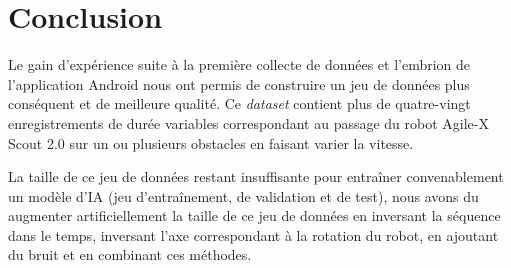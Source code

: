 \section{Conclusion}
Le gain d'expérience suite à la première collecte de données et l'embrion de l'application Android nous ont permis de construire un jeu de données plus conséquent et de meilleure qualité. Ce \textit{dataset} contient plus de quatre-vingt enregistrements de durée variables correspondant au passage du robot Agile-X Scout 2.0 sur un ou plusieurs obstacles en faisant varier la vitesse.

La taille de ce jeu de données restant insuffisante pour entraîner convenablement un modèle d'IA (jeu d'entraînement, de validation et de test), nous avons du augmenter artificiellement la taille de ce jeu de données en inversant la séquence dans le temps, inversant l'axe correspondant à la rotation du robot, en ajoutant du bruit et en combinant ces méthodes.